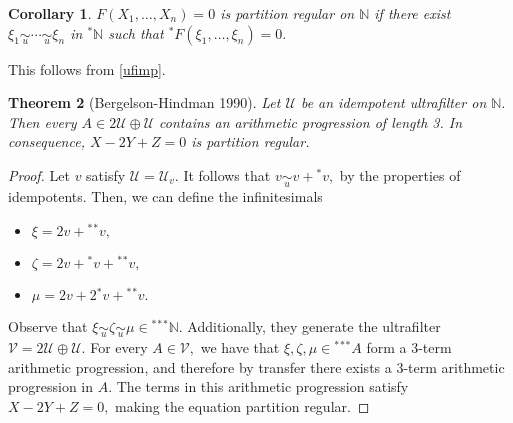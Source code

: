\documentclass[12pt]{amsart}
\newcommand{\stt}{{}^*}
\newcommand{\NN}{\mathbb{N}}
\newcommand{\mcU}{\mathcal{U}}
\theoremstyle{plain}
\newtheorem{thm}{Theorem}
\newtheorem{cor}[thm]{Corollary}
\theoremstyle{definition}
\theoremstyle{remark}
\theoremstyle{theorem}
\numberwithin{equation}{section}
\numberwithin{thm}{section}
\begin{document}
\begin{cor}
$F(X_1, \ldots , X_n) = 0$ is partition regular on $\NN$ if there exist $\xi_1 \underset{u}{\sim} \cdots \underset{u}{\sim} \xi_n$ in $\stt \NN$ such that $\stt F(\xi_1, \ldots, \xi_n) =0.$
\end{cor}
This follows from \ref{ufimp}.
\begin{thm}[Bergelson-Hindman 1990]
Let $\mcU$ be an idempotent ultrafilter on $\NN.$ Then every $A \in 2\mcU \oplus \mcU$ contains an arithmetic progression of length 3. In consequence, $X-2Y+Z=0$ is partition regular. 
\end{thm}
\begin{proof}
Let $v$ satisfy $\mcU = \mcU_v.$ It follows that $v \underset{u}{\sim} v + \stt v,$ by the properties of idempotents. Then, we can define the infinitesimals
\begin{itemize}
    \item $\xi = 2v + \stt \stt v,$
    \item $\zeta = 2v + \stt v + \stt \stt v,$
    \item $\mu = 2v + 2 \stt v + \stt \stt v.$
\end{itemize}
Observe that $\xi \underset{u}{\sim} \zeta \underset{u}{\sim} \mu \in \stt \stt \stt \NN.$ Additionally, they generate the ultrafilter $\mathcal{V} = 2\mcU \oplus \mcU.$ For every $A \in \mathcal{V},$ we have that $\xi, \zeta, \mu \in \stt \stt \stt A$ form a $3$-term arithmetic progression, and therefore by transfer there exists a $3$-term arithmetic progression in $A.$ The terms in this arithmetic progression satisfy $X - 2Y + Z = 0,$ making the equation partition regular.
\end{proof}
\end{document}
